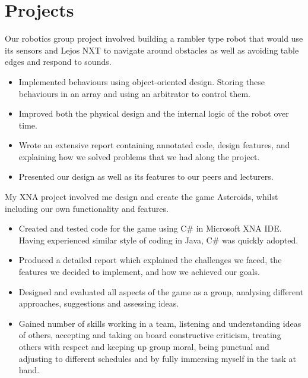 \documentclass[10pt,a4paper]{moderncv}
\begin{document}
        \section{Projects}
        {
        Our robotics group project involved building a rambler type robot that would use its sensors and Lejos NXT to navigate around obstacles as well as avoiding table edges and respond to sounds.
        \begin{itemize}
            \item Implemented behaviours using object-oriented design. Storing these behaviours in an array and using an arbitrator to control them.
            \item Improved both the physical design and the internal logic of the robot over time.
            \item Wrote an extensive report containing annotated code, design features, and explaining how we solved problems that we had along the project.
            \item Presented our design as well as its features to our peers and lecturers.
        \end{itemize}
        }
        {
        My XNA project involved me design and create the game Asteroids, whilst including our own functionality and features.
        \begin{itemize}
            \item Created and tested code for the game using C\# in Microsoft XNA IDE. Having experienced similar style of coding in Java, C\# was quickly adopted.
            \item Produced a detailed report which explained the challenges we faced, the features we decided to implement, and how we achieved our goals.
            \item Designed and evaluated all aspects of the game as a group, analysing different approaches, suggestions and assessing ideas.
            \item Gained number of skills working in a team, listening and understanding ideas of others, accepting and taking on board constructive criticism, treating others with respect and keeping up group moral, being punctual and adjusting to different schedules and by fully immersing myself in the task at hand.
        \end{itemize}
        }
\end{document}
